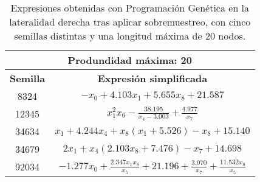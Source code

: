 \begin{table}[H]
\centering
\begin{tabular}{|c|c|}
\hline
\multicolumn{2}{|c|}{\textbf{Produndidad máxima: 20}}                                                                                                               \\ \hline
\textbf{Semilla} & \textbf{Expresión simplificada}                                                                                                                  \\ \hline
8324             & $- x_{0} + 4.103 x_{1} + 5.655 x_{8} + 21.587$                                                                                  \\ \hline
12345            & $x_{1}^{2} x_{6} - \frac{38.195}{x_{4} - 3.003} + \frac{4.977}{x_{7}}$                                                            \\ \hline
34634            & $x_{1} + 4.244 x_{4} + x_{8} \left(x_{1} + 5.526\right) - x_{8} + 15.140$                                                         \\ \hline
34679            & $2 x_{1} + x_{4} \left(2.103 x_{8} + 7.476\right) - x_{7} + 14.698$                                                                     \\ \hline
92034            & $- 1.277 x_{0} + \frac{2.347 x_{1} x_{8}}{x_{5}} + 21.196 + \frac{3.070}{x_{7}} + \frac{11.532 x_{8}}{x_{5}}$ \\ \hline
\end{tabular}%
\caption{Expresiones obtenidas con Programación Genética en la lateralidad derecha tras aplicar sobremuestreo, con cinco semillas distintas y una longitud máxima de 20 nodos.}\label{table:exp_PG_over_l1_20}

\end{table}




